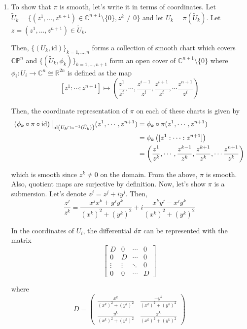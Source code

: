 \documentclass{article}
\newcommand{\R}{\mathbb{R}}
\newcommand{\C}{\mathbb{C}}
\newcommand{\restr}[2]{{%
  \left.\kern-\nulldelimiterspace %
  #1 %
  \vphantom{\big|} %
  \right|_{#2} %
  }}
\begin{document}
\begin{enumerate}[label=(\alph*)]
  \item To show that $\pi$ is smooth, let's write it in terms of coordinates. Let $\tilde{U}_k = \{ \left(z^1, \dots, z^{n+1}\right) \in \C^{n+1} \setminus \{0\}, z^k \neq 0 \}$ and let $U_k = \pi(\tilde{U}_k)$. Let $z = (z^1, \dots, z^{n+1}) \in \tilde{U}_k$. 
  
  \vskip 0.25cm
  Then, $\{\left(U_k, \mathrm{id}\right)\}_{k = 1, \dots, n}$ forms a collection of smooth chart which covers $\mathbb{CP}^n$ and $\{ \left( \tilde{U}_k, \phi_k \right) \}_{k=1,\dots,n+1}$ form an open cover of $\C^{n+1} \setminus \{0\}$ where $\phi_i : U_i \rightarrow \C^{n} \cong \R^{2n}$ is defined as the map
  \[ [z^1:\cdots:z^{n+1}] \mapsto \left( \frac{z^{1}}{z^{i}}, \cdots, \frac{z^{i-1}}{z^{i}}, \frac{z^{i+1}}{z^{i}}, \cdots \frac{z^{n+1}}{z^{i}}\right)  \]

  Then, the coordinate representation of $\pi$ on each of these charts is given by 
  \begin{align*}
    \restr{\left(\phi_{k} \circ \pi \circ \mathrm{id}\right)}{\mathrm{id}\left(U_k \cap \pi^{-1}(\tilde{U}_k)\right)}(z^1, \cdots, z^{n+1}) &= \phi_{k} \circ \pi(z^1, \cdots, z^{n+1}) \\
    &= \phi_k \left( [z^1:\cdots:z^{n+1}] \right) \\
    &=\left( \frac{z^{1}}{z^{k}}, \cdots, \frac{z^{k-1}}{z^{k}}, \frac{z^{k+1}}{z^{k}}, \cdots \frac{z^{n+1}}{z^{k}}\right)
  \end{align*}
  
  which is smooth since $z^k \neq 0$ on the domain. From the above, $\pi$ is smooth. Also, quotient maps are surjective by definition. Now, let's show $\pi$ is a submersion. Let's denote $z^j =  z^j + i y^j$. Then, 
  \[ \frac{z^j}{z^k} = \frac{x^j x^k + y^j y^k}{(x^k)^2 + (y^k)^2} + i \frac{x^k y^j - x^j y^k}{(x^k)^2 + (y^k)^2}  \]

  In the coordinates of $U_i$, the differential $d\pi$ can be represented with the matrix 
  \[ \begin{bmatrix}
    D & 0 & \cdots & 0 \\
    0 & D & \cdots & 0 \\
    \vdots & \vdots & \ddots & 0 \\
    0 & 0 & \cdots & D
  \end{bmatrix} \]

  where 
  \[ D = \begin{pmatrix}
    \frac{x^k}{(x^k)^2 + (y^k)^2} & \frac{-y^k}{(x^k)^2 + (y^k)^2} \\
    \frac{y^k}{(x^k)^2 + (y^k)^2} & \frac{x^k}{(x^k)^2 + (y^k)^2}
  \end{pmatrix} \]


\end{enumerate}
\end{document}
